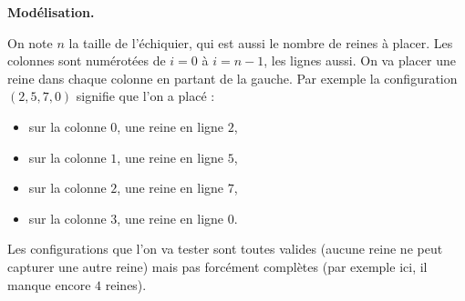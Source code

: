 \documentclass[11pt,class=report,crop=false]{standalone}
\begin{document}
\begin{cours}

\textbf{Modélisation.}

On note $n$ la taille de l'échiquier, qui est aussi le nombre de reines à placer.
Les colonnes sont numérotées de $i=0$ à $i=n-1$, les lignes aussi.
On va placer une reine dans chaque colonne en partant de la gauche.
Par exemple la configuration $(2,5,7,0)$ signifie que l'on a placé :
\begin{itemize} 
  \item sur la colonne $0$, une reine en ligne $2$,
  \item sur la colonne $1$, une reine en ligne $5$,
  \item sur la colonne $2$, une reine en ligne $7$,
  \item sur la colonne $3$, une reine en ligne $0$.    
\end{itemize}


Les configurations que l'on va tester sont toutes valides (aucune reine ne peut capturer une autre reine) mais pas forcément complètes (par exemple ici, il manque encore $4$ reines).

\end{cours}


\end{document}
